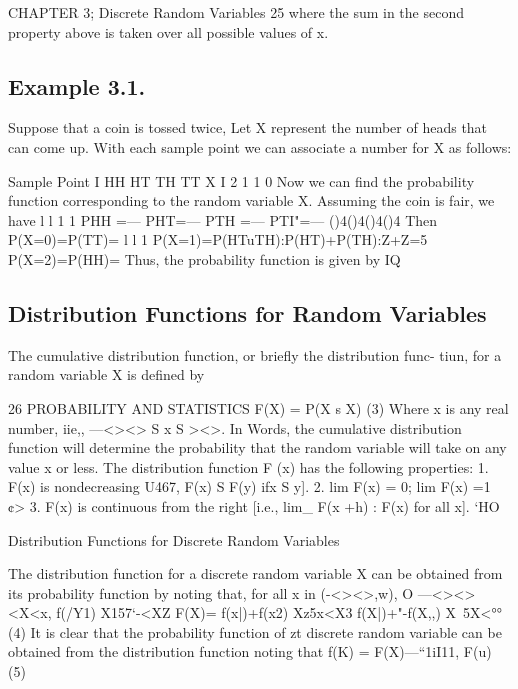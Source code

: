 CHAPTER 3; Discrete Random Variables 25
where the sum in the second property above is taken over all possible
values of x.
\subsection*{Example 3.1.}
 Suppose that a coin is tossed twice, Let X represent
the number of heads that can come up. With each sample point we can
associate a number for X as follows:

Sample Point I HH HT TH TT
X I 2 1 1 0
Now we can ﬁnd the probability function corresponding to
the random variable X. Assuming the coin is fair, we have
l l 1 1
PHH =— PHT=— PTH =— PTI"=—
()4()4()4()4
Then
P(X=0)=P(TT)=%
l l 1
P(X=1)=P(HTuTH):P(HT)+P(TH):Z+Z=5
P(X=2)=P(HH)=%
Thus, the probability function is given by
IQ
\subsection*{Distribution Functions for Random Variables}
The cumulative distribution function, or brieﬂy the distribution func-
tiun, for a random variable X is deﬁned by



26 PROBABILITY AND STATISTICS
F(X) = P(X s X) (3)
Where x is any real number, iie,, —<><> S x S ><>.
In Words, the cumulative distribution function will determine
the probability that the random variable will take on any value x or less.
The distribution function F (x) has the following properties:
1. F(x) is nondecreasing U467, F(x) S F(y) ifx S y].
2. lim F(x) = 0; lim F(x) =1
¢\*>%
3. F(x) is continuous from the right [i.e., lim_ F(x +h) : F(x)
for all x]. ‘HO

Distribution Functions for Discrete Random Variables

The distribution function for a discrete random variable X can be
obtained from its probability function by noting that, for all x in (-<><>,w),
O —<><><X<x,
f(/Y1) X157‘-<XZ
F(X)= f(x|)+f(x2) Xz5x<X3
f(X|)+"-f(X,,) X~5X<°° (4)
It is clear that the probability function of zt discrete random variable
can be obtained from the distribution function noting that
f(K) = F(X)—“1iI11, F(u) (5)

